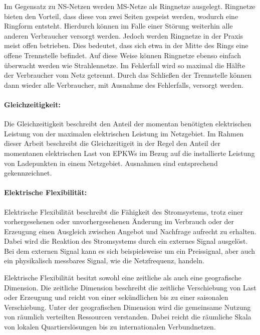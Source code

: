 Im Gegensatz zu \gls{NS}-Netzen werden \gls{MS}-Netze als Ringnetze ausgelegt.
Ringnetze bieten den Vorteil, dass diese von zwei Seiten gespeist werden, wodurch eine Ringform entsteht.
Hierdurch können im Falle einer Störung weiterhin alle anderen Verbraucher versorgt werden.
Jedoch werden Ringnetze in der Praxis meist offen betrieben.
Dies bedeutet, dass sich etwa in der Mitte des Rings eine offene Trennstelle befindet.
Auf diese Weise können Ringnetze ebenso einfach überwacht werden wie Strahlennetze.
Im Fehlerfall wird so maximal die Hälfte der Verbraucher vom Netz getrennt.
Durch das Schließen der Trennstelle können dann wieder alle Verbraucher, mit Ausnahme des Fehlerfalls, versorgt werden. \cite{WNG2020} \cite{Westermann2019}


\paragraph{Gleichzeitigkeit:}

Die Gleichzeitigkeit beschreibt den Anteil der momentan benötigten elektrischen Leistung von der maximalen elektrischen Leistung im Netzgebiet. \cite{Agora2019} 
Im Rahmen dieser Arbeit beschreibt die Gleichzeitigeit in der Regel den Anteil der momentanen elektrischen Last von \glspl{EPKW} im Bezug auf die installierte Leistung von Ladepunkten in einem Netzgebiet.
Ausnahmen sind entsprechend gekennzeichnet.


\paragraph{Elektrische Flexibilität:}

Elektrische Flexibilität beschreibt die Fähigkeit des Stromsystems, trotz einer vorhergesehenen oder unvorhergesehenen Änderung im Verbrauch oder der Erzeugung einen Ausgleich zwischen Angebot und Nachfrage aufrecht zu erhalten.
Dabei wird die Reaktion des Stromsystems durch ein externes Signal ausgelöst.
Bei dem externen Signal kann es sich beispielsweise um ein Preissignal, aber auch ein physikalisch messbares Signal, wie die Netzfrequenz, handeln. \medskip

Elektrische Flexibilität besitzt sowohl eine zeitliche als auch eine geografische Dimension.
Die zeitliche Dimension beschreibt die zeitliche Verschiebung von Last oder Erzeugung und reicht von einer sekündlichen bis zu einer saisonalen Verschiebung.
Unter der geografischen Dimension wird die gemeinsame Nutzung von räumlich verteilten Ressourcen verstanden.
Dabei reicht die räumliche Skala von lokalen Quartierslösungen bis zu internationalen Verbundnetzen. \cite{BNetzA2017} \cite{IEA2014}


